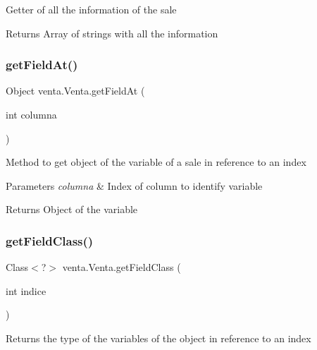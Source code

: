Getter of all the information of the sale

\begin{DoxyReturn}{Returns}
Array of strings with all the information 
\end{DoxyReturn}
\mbox{\label{classventa_1_1_venta_a1b960ae8fc8ae2781ec32e46c2a9e78e}} 
\subsubsection{\texorpdfstring{get\+Field\+At()}{getFieldAt()}}
{\footnotesize\ttfamily Object venta.\+Venta.\+get\+Field\+At (\begin{DoxyParamCaption}\item[{int}]{columna }\end{DoxyParamCaption})\hspace{0.3cm}{\ttfamily [inline]}}

Method to get object of the variable of a sale in reference to an index


\begin{DoxyParams}{Parameters}
{\em columna} & Index of column to identify variable \\
\hline
\end{DoxyParams}
\begin{DoxyReturn}{Returns}
Object of the variable 
\end{DoxyReturn}
\mbox{\label{classventa_1_1_venta_ad2b7e54e1e88a1e3af3d72c11f4331cb}} 
\subsubsection{\texorpdfstring{get\+Field\+Class()}{getFieldClass()}}
{\footnotesize\ttfamily Class$<$?$>$ venta.\+Venta.\+get\+Field\+Class (\begin{DoxyParamCaption}\item[{int}]{indice }\end{DoxyParamCaption})\hspace{0.3cm}{\ttfamily [inline]}}

Returns the type of the variables of the object in reference to an index


